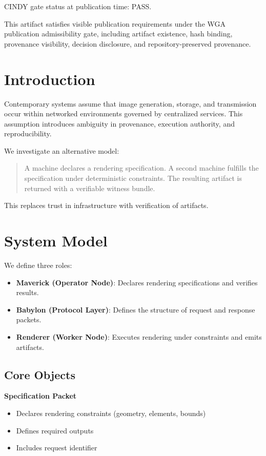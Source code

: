 \documentclass[11pt]{article}
\begin{document}
CINDY gate status at publication time: PASS.

This artifact satisfies visible publication requirements under the WGA publication admissibility gate, including artifact existence, hash binding, provenance visibility, decision disclosure, and repository-preserved provenance.

\section{Introduction}

Contemporary systems assume that image generation, storage, and transmission occur within networked environments governed by centralized services. This assumption introduces ambiguity in provenance, execution authority, and reproducibility.

We investigate an alternative model:

\begin{quote}
A machine declares a rendering specification. A second machine fulfills the specification under deterministic constraints. The resulting artifact is returned with a verifiable witness bundle.
\end{quote}

This replaces trust in infrastructure with verification of artifacts.

\section{System Model}

We define three roles:

\begin{itemize}
\item \textbf{Maverick (Operator Node)}: Declares rendering specifications and verifies results.
\item \textbf{Babylon (Protocol Layer)}: Defines the structure of request and response packets.
\item \textbf{Renderer (Worker Node)}: Executes rendering under constraints and emits artifacts.
\end{itemize}

\subsection{Core Objects}

\textbf{Specification Packet}
\begin{itemize}
\item Declares rendering constraints (geometry, elements, bounds)
\item Defines required outputs
\item Includes request identifier
\end{itemize}
\end{document}
